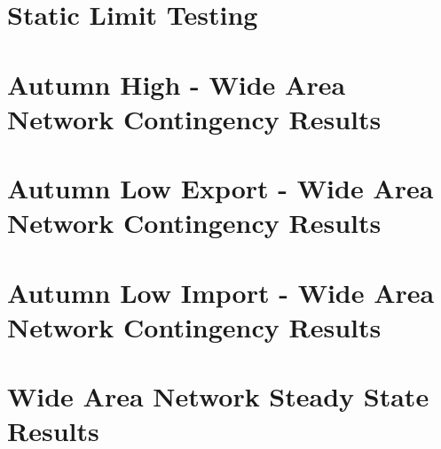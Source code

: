 \documentclass{../grid-link-report}
\begin{document}
	\section{Static Limit Testing}
	\label{Static Limit Testing}
	
	\section{Autumn High - Wide Area Network Contingency Results}
	\label{Autumn High - Wide Area Network Contingency Results}

	\section{Autumn Low Export - Wide Area Network Contingency Results}
	\label{Autumn Low Export - Wide Area Network Contingency Results}
	
	\section{Autumn Low Import - Wide Area Network Contingency Results}
	\label{Autumn Low Import - Wide Area Network Contingency Results}
	
	\section{Wide Area Network Steady State Results}
	\label{Wide Area Network Steady State Results}

	

	
\end{document}
